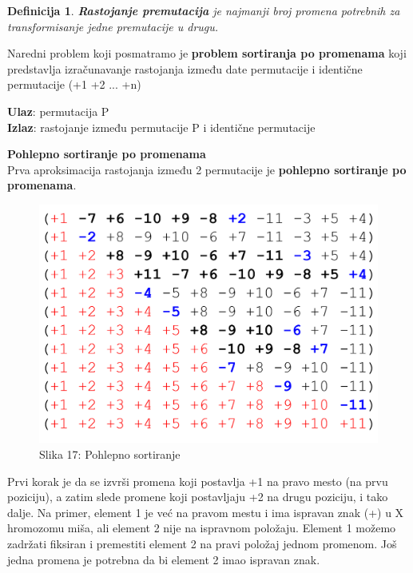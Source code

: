 \documentclass{article}
\newtheorem{definicija}{Definicija}
\begin{document}
\begin{definicija}{\textbf{Rastojanje premutacija} je najmanji broj promena potrebnih za transformisanje jedne premutacije u drugu.}
\end{definicija}

\noindent Naredni problem koji posmatramo je \textbf{problem sortiranja po promenama} koji predstavlja izračunavanje rastojanja između date permutacije i identične permutacije (+1 +2 ... +n)

\textbf{Ulaz}: permutacija P\\
\indent \textbf{Izlaz}: rastojanje između permutacije P i identične permutacije\\

\vspace{1cm}

\hspace{2cm} \textbf{Pohlepno sortiranje po promenama}\\

Prva aproksimacija rastojanja između 2 permutacije je \textbf{pohlepno sortiranje po promenama}.\\

\begin{figure}[h!]
\centering
\includegraphics[scale=0.4]{slike/greedy_sort.png}
\caption{Slika 17: Pohlepno sortiranje}
\label{slika:X}
\end{figure}

Prvi korak je da se izvrši promena koji postavlja +1 na pravo mesto (na prvu poziciju), a zatim slede promene koji postavljaju
+2 na drugu poziciju, i tako dalje. Na primer, element 1 je već na pravom mestu i ima ispravan znak (+) u X hromozomu miša, ali element 2 nije na ispravnom položaju. Element 1 možemo zadržati fiksiran i premestiti element 2 na pravi položaj jednom promenom. Još jedna promena je potrebna da bi element 2 imao ispravan znak.\\
\end{document}
